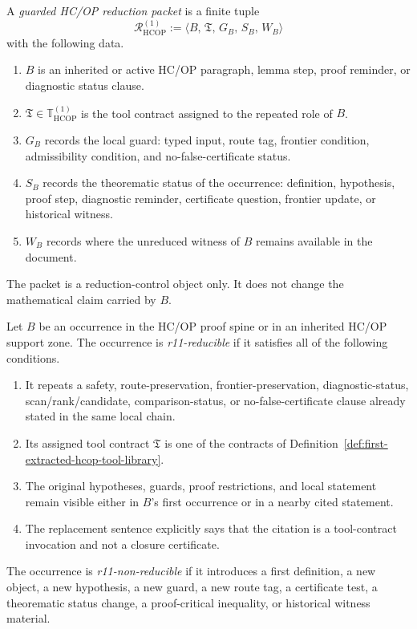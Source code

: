 \begin{definition}
\label{def:guarded-hcop-reduction-packet}
A \emph{guarded HC/OP reduction packet} is a finite tuple
\[
  \mathcal R_{\mathrm{HCOP}}^{(1)}
  :=
  \langle B,\, \mathfrak T,\, G_B,\, S_B,\, W_B\rangle
\]
with the following data.
\begin{enumerate}[leftmargin=2em,label=(\roman*)]
  \item \(B\) is an inherited or active HC/OP paragraph, lemma step, proof reminder, or diagnostic status clause.
  \item \(\mathfrak T\in\mathbb T_{\mathrm{HCOP}}^{(1)}\) is the tool contract assigned to the repeated role of \(B\).
  \item \(G_B\) records the local guard: typed input, route tag, frontier condition, admissibility condition, and no-false-certificate status.
  \item \(S_B\) records the theorematic status of the occurrence: definition, hypothesis, proof step, diagnostic reminder, certificate question, frontier update, or historical witness.
  \item \(W_B\) records where the unreduced witness of \(B\) remains available in the document.
\end{enumerate}
The packet is a reduction-control object only. It does not change the mathematical claim carried by \(B\).
\end{definition}

\begin{definition}
\label{def:reducible-and-nonreducible-hcop-occurrences}
Let \(B\) be an occurrence in the HC/OP proof spine or in an inherited HC/OP support zone. The occurrence is \emph{r11-reducible} if it satisfies all of the following conditions.
\begin{enumerate}[leftmargin=2em,label=(\roman*)]
  \item It repeats a safety, route-preservation, frontier-preservation, diagnostic-status, scan/rank/candidate, comparison-status, or no-false-certificate clause already stated in the same local chain.
  \item Its assigned tool contract \(\mathfrak T\) is one of the contracts of Definition~\ref{def:first-extracted-hcop-tool-library}.
  \item The original hypotheses, guards, proof restrictions, and local statement remain visible either in \(B\)'s first occurrence or in a nearby cited statement.
  \item The replacement sentence explicitly says that the citation is a tool-contract invocation and not a closure certificate.
\end{enumerate}
The occurrence is \emph{r11-non-reducible} if it introduces a first definition, a new object, a new hypothesis, a new guard, a new route tag, a certificate test, a theorematic status change, a proof-critical inequality, or historical witness material.
\end{definition}

